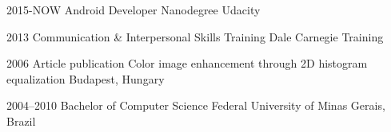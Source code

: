 \documentclass[]{friggeri-cv}
\begin{document}
\begin{entrylist}
\entry
{2015-NOW}
{Android {\normalfont Developer Nanodegree}}
{Udacity}


\entry
{2013}
{Communication \& Interpersonal {\normalfont Skills Training}}
{Dale Carnegie Training}


\entry
{2006}
{Article publication {\normalfont Color image enhancement through 2D histogram equalization}}
{Budapest, Hungary}


\entry
{2004--2010}
{{\normalfont Bachelor of} Computer Science}
{Federal University of Minas Gerais, Brazil}

\end{entrylist}




%
%
%
%
%
%
%
%
%
%
%
%
%
%
%
%
\end{document}
